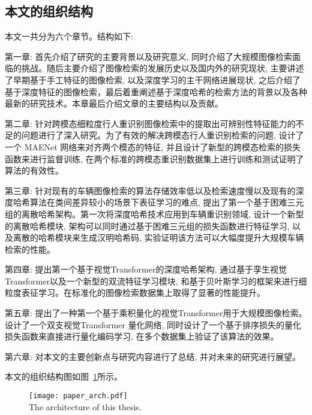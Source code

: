 \subsection{本文的组织结构}
本文一共分为六个章节。结构如下: \par
第一章: 首先介绍了研究的主要背景以及研究意义, 同时介绍了大规模图像检索面临的挑战。随后主要介绍了图像检索的发展历史以及国内外的研究现状, 主要讲述了早期基于手工特征的图像检索, 以及深度学习的主干网络进展现状, 之后介绍了基于深度特征的图像检索，最后着重阐述基于深度哈希的检索方法的背景以及各种最新的研究技术。本章最后介绍文章的主要结构以及贡献。 \par
第二章: 针对跨模态细粒度行人重识别图像检索中的提取出可辨别性特征能力的不足的问题进行了深入研究。为了有效的解决跨模态行人重识别检索的问题, 设计了一个 MAENet 网络来对齐两个模态的特征, 并且设计了新型的跨模态检索的损失函数来进行监督训练, 在两个标准的跨模态重识别数据集上进行训练和测试证明了算法的有效性。 \par
第三章:  针对现有的车辆图像检索的算法存储效率低以及检索速度慢以及现有的深度哈希算法在类间差异较小的场景下表征学习的难点, 提出了第一个基于困难三元组的离散哈希架构。第一次将深度哈希技术应用到车辆重识别领域, 设计一个新型的离散哈希模块, 架构可以同时通过基于困难三元组的损失函数进行特征学习, 以及离散的哈希模块来生成汉明哈希码, 实验证明该方法可以大幅度提升大规模车辆检索的性能。 \par
第四章: 提出第一个基于视觉Transformer的深度哈希架构, 通过基于孪生视觉Transformer以及一个新型的双流特征学习模块, 和基于贝叶斯学习的框架来进行细粒度表征学习。在标准化的图像检索数据集上取得了显著的性能提升。 \par
第五章: 提出了一种第一个基于乘积量化的视觉Transformer用于大规模图像检索。设计了一个双支视觉Transformer 量化网络, 同时设计了一个基于排序损失的量化损失函数来直接进行量化编码学习, 在多个数据集上验证了该算法的效果。 \par
第六章: 对本文的主要创新点与研究内容进行了总结, 并对未来的研究进行展望。 \par 
本文的组织结构图如图~\ref{fig:overallarch}所示。
\begin{figure}[!htp]
    \centering
    \texttt{[image: paper\_arch.pdf]} \\
      {The architecture of this thesis.}
   \label{fig:overallarch}
\end{figure}